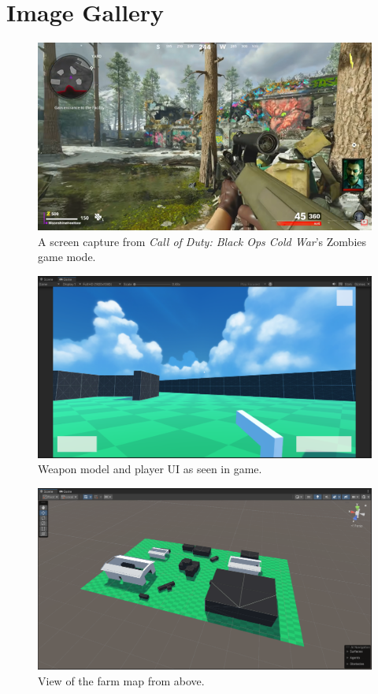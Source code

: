 \documentclass[11pt]{article}
\begin{document}
\section{Image Gallery}
\begin{figure}[htb] 
    \centering
    \includegraphics[width=\columnwidth]{inspo}
    \caption{A screen capture from \textit{Call of Duty: Black Ops Cold War}'s Zombies game mode.}
    \label{fig:inspo}
\end{figure}

\begin{figure}[htb] 
    \centering
    \includegraphics[width=\columnwidth]{weapon}
    \caption{Weapon model and player UI as seen in game.}
    \label{fig:weapon}
\end{figure}

\begin{figure}[ht] 
    \centering
    \includegraphics[width=\columnwidth]{farm-map}
    \caption{View of the farm map from above.}
    \label{fig:farm-map}
\end{figure}
\end{document}
